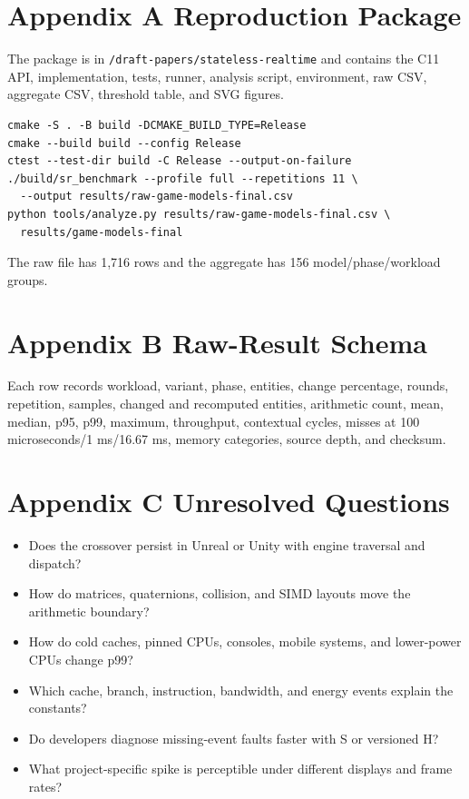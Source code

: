 \section{Appendix A Reproduction Package}

The package is in \texttt{/draft-papers/stateless-realtime} and contains the C11 API, implementation, tests, runner, analysis script, environment, raw CSV, aggregate CSV, threshold table, and SVG figures.

\begin{verbatim}
cmake -S . -B build -DCMAKE_BUILD_TYPE=Release
cmake --build build --config Release
ctest --test-dir build -C Release --output-on-failure
./build/sr_benchmark --profile full --repetitions 11 \
  --output results/raw-game-models-final.csv
python tools/analyze.py results/raw-game-models-final.csv \
  results/game-models-final
\end{verbatim}

The raw file has 1,716 rows and the aggregate has 156 model/phase/workload groups.

\section{Appendix B Raw-Result Schema}

Each row records workload, variant, phase, entities, change percentage, rounds, repetition, samples, changed and recomputed entities, arithmetic count, mean, median, p95, p99, maximum, throughput, contextual cycles, misses at 100 microseconds/1 ms/16.67 ms, memory categories, source depth, and checksum.

\section{Appendix C Unresolved Questions}

\begin{itemize}
\item Does the crossover persist in Unreal or Unity with engine traversal and dispatch?
\item How do matrices, quaternions, collision, and SIMD layouts move the arithmetic boundary?
\item How do cold caches, pinned CPUs, consoles, mobile systems, and lower-power CPUs change p99?
\item Which cache, branch, instruction, bandwidth, and energy events explain the constants?
\item Do developers diagnose missing-event faults faster with S or versioned H?
\item What project-specific spike is perceptible under different displays and frame rates?
\end{itemize}

